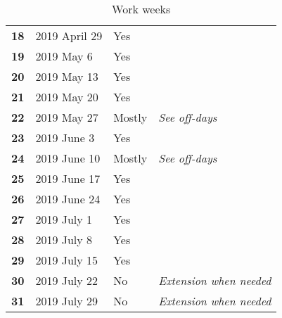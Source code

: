 \begin{table} [h!]
\begin{tabular}{l|lll}
		\textbf{18} 	& 	2019 April 29		& 	Yes		&  \\
		\textbf{19} 	& 	2019 May 6			& 	Yes		&  \\
		\rowcolor{Gray}
		\textbf{20} 	& 	2019 May 13			& 	Yes		&  \\
		\textbf{21} 	& 	2019 May 20			& 	Yes		&  \\
		\rowcolor{Gray}
		\textbf{22} 	& 	2019 May 27			& 	Mostly	&  \textit{See off-days}\\
		\textbf{23} 	& 	2019 June 3			& 	Yes		&  \\
		\rowcolor{Gray}
		\textbf{24} 	& 	2019 June 10		& 	Mostly	&  \textit{See off-days}\\
		\textbf{25} 	& 	2019 June 17		& 	Yes		&  \\
		\rowcolor{Gray}
		\textbf{26} 	& 	2019 June 24		& 	Yes		&  \\
		\textbf{27} 	& 	2019 July 1			& 	Yes		&  \\
		\rowcolor{Gray}
		\textbf{28} 	& 	2019 July 8			& 	Yes		&  \\
		\textbf{29} 	& 	2019 July 15		& 	Yes		&  \\
		\rowcolor{Gray}
		\textbf{30} 	& 	2019 July 22		& 	No		&  \textit{Extension when needed}\\
		\textbf{31} 	& 	2019 July 29		& 	No		&  \textit{Extension when needed}\\
		\hline
	\end{tabular}
	\caption{Work weeks}
	\label{tab:workweeks}
\end{table}